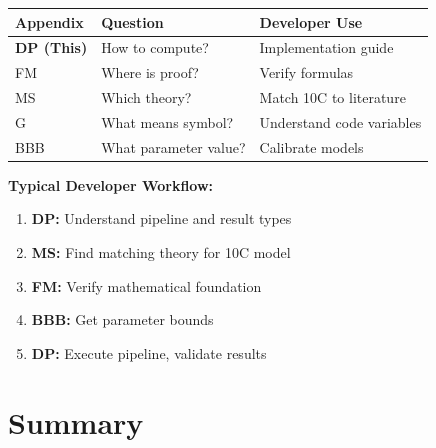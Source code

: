 \begin{tcolorbox}[colback=purple!3!white, colframe=purple!60!black,
    title=\textbf{DP in the REF Appendix Family}]

\begin{center}
\begin{tabular}{|l|l|l|}
\hline
\textbf{Appendix} & \textbf{Question} & \textbf{Developer Use} \\
\hline
\hline
\textbf{DP (This)} & How to compute? & Implementation guide \\
FM & Where is proof? & Verify formulas \\
MS & Which theory? & Match 10C to literature \\
G & What means symbol? & Understand code variables \\
BBB & What parameter value? & Calibrate models \\
\hline
\end{tabular}
\end{center}

\textbf{Typical Developer Workflow:}
\begin{enumerate}[nosep]
    \item \textbf{DP:} Understand pipeline and result types
    \item \textbf{MS:} Find matching theory for 10C model
    \item \textbf{FM:} Verify mathematical foundation
    \item \textbf{BBB:} Get parameter bounds
    \item \textbf{DP:} Execute pipeline, validate results
\end{enumerate}

\end{tcolorbox}

\section{Summary}
\label{sec:dp-summary}

